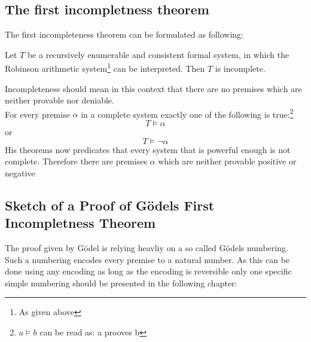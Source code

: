 \documentclass[english,12pt]{article}
\begin{document}
\subsection{The first incompletness theorem}
The first incompleteness theorem can be formulated as following:\\
\begin{displayquote}
    Let $T$ be a recursively enumerable and consistent formal system, in which the Robinson arithmetic system\footnote{As given above} can be interpreted. Then $T$ is incomplete.
\end{displayquote}
Incompleteness should mean in this context that there are no premises which are neither provable nor deniable.\\
For every premise $\alpha$ in a complete system exactly one of the following is true:\footnote{$a \vDash b$ can be read as: a prooves b}
$$
    {\displaystyle T\vDash \alpha }
$$
or
$$
    {\displaystyle T\vDash \neg \alpha }
$$
His theorems now predicates that every system that is powerful enough is not complete. Therefore there are premises $\alpha$ which are neither provable positive or negative
\subsection{Sketch of a Proof of Gödels First Incompletness Theorem}
The proof given by Gödel is relying heavliy on a so called Gödels numbering. Such a numbering encodes every premise to a natural number. As this can be done using any encoding as long as the encoding is reversible only one specific simple numbering should be presented in the following chapter:
\end{document}
